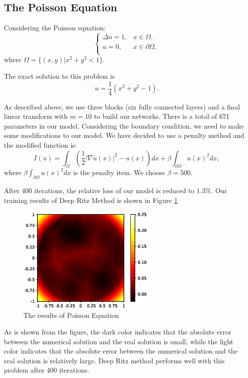 \documentclass{article}
\begin{document}
\subsection{The Poisson Equation}
\par Considering the Poisson equation:
\begin{equation}
	\begin{cases}
 		\Delta u=1, & x\in \Omega, \\
 		u=0, & x\in \partial \Omega, \\
 	\end{cases}
\end{equation}
where $\Omega =\{(x,y)| x^2+y^2<1\}$.
\par The exact solution to this problem is 
\begin{equation}
u=\frac{1}{4}(x^2+y^2-1).
\end{equation}

\par As described above, we use three blocks (six fully connected layers) and a final linear transform with $m=10$ to build our networks. There is a total of 671 parameters in our model. Considering the boundary condition, we need to make some modifications to our model. We have decided to use a penalty method and the modified function is:
\begin{equation}\label{functional}
I(u)=\int_{\Omega}\left(\frac{1}{2}|\nabla u(x)|^2-u(x)\right)dx+\beta\int_{\partial \Omega}u(x)^2dx,
\end{equation}
where $\beta\int_{\partial \Omega}u(x)^2dx$ is the penalty item. We choose $\beta=500$.
\par After 400 iterations, the relative loss of our model is reduced to $1.3\%$. Our training results of Deep Ritz Method is shown in Figure \ref{3.1a}

\begin{figure}[ht]
 	 \centering
 	 \includegraphics[width=0.6\textwidth]{./images/loss_5_1.eps} 
	 \caption {The results of Poisson Equation}
	 \label{3.1a}
\end{figure}
As is shown from the figure, the dark color indicates that the absolute error between the numerical solution and the real solution is small, while the light color indicates that the absolute error between the numerical solution and the real solution is relatively large. Deep Ritz method performs well with this problem after 400 iterations.
\end{document}
